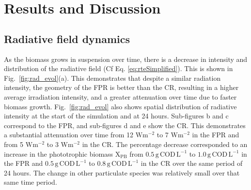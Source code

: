 
\section{Results and Discussion}

\subsection{Radiative field dynamics}

As the biomass grows in suspension over time, there is a decrease in intensity and distribution of the radiative field (Cf Eq. \ref{eq:rteSimplified}). This is shown in Fig.\ \ref{fig:rad_evol}(a). This demonstrates that despite a similar radiation intensity, the geometry of the FPR is better than the CR, resulting in a higher average irradiation intensity, and a greater attenuation over time due to faster biomass growth. Fig.\ \ref{fig:rad_evol} also shows spatial distribution of radiative intensity at the start of the simulation and at 24 hours. Sub-figures b and c correspond to the FPR, and sub-figures d and e show the CR. This demonstrates a substantial attenuation over time from 12 $\mathrm{W m^{-2}}$ to 7 $\mathrm{W m^{-2}}$ in the FPR and from 5 $\mathrm{W m^{-2}}$ to 3 $\mathrm{W m^{-2}}$ in the CR. The percentage decrease corresponded to an increase in the phototrophic biomass $\mathrm{X_{PB}}$ from $\mathrm{0.5 \, g\, COD\, L^{-1}}$ to $\mathrm{1.0 \, g\, COD\, L^{-1}}$ in the FPR and $\mathrm{0.5 \, g\, COD\, L^{-1}}$ to $\mathrm{0.8 \, g\, COD\, L^{-1}}$ in the CR over the same period of 24 hours. The change in other particulate species was relatively small over that same time period. 

